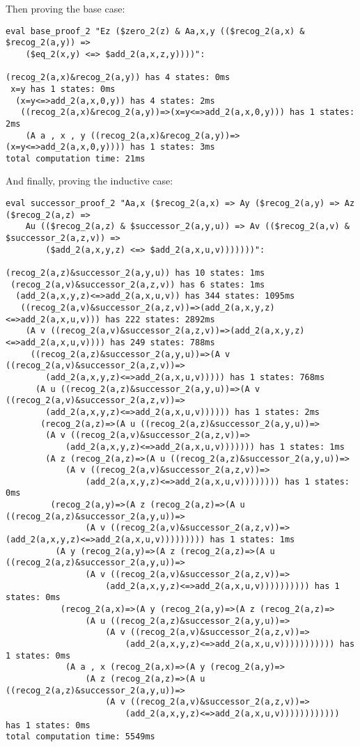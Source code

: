 Then proving the base case:
\begin{lstlisting}[basicstyle=\scriptsize\ttfamily]
eval base_proof_2 "Ez ($zero_2(z) & Aa,x,y (($recog_2(a,x) & $recog_2(a,y)) => 
    ($eq_2(x,y) <=> $add_2(a,x,z,y))))":

(recog_2(a,x)&recog_2(a,y)) has 4 states: 0ms
 x=y has 1 states: 0ms
  (x=y<=>add_2(a,x,0,y)) has 4 states: 2ms
   ((recog_2(a,x)&recog_2(a,y))=>(x=y<=>add_2(a,x,0,y))) has 1 states: 2ms
    (A a , x , y ((recog_2(a,x)&recog_2(a,y))=>(x=y<=>add_2(a,x,0,y)))) has 1 states: 3ms
total computation time: 21ms
\end{lstlisting}

And finally, proving the inductive case:
\begin{lstlisting}[basicstyle=\scriptsize\ttfamily]
eval successor_proof_2 "Aa,x ($recog_2(a,x) => Ay ($recog_2(a,y) => Az ($recog_2(a,z) => 
    Au (($recog_2(a,z) & $successor_2(a,y,u)) => Av (($recog_2(a,v) & $successor_2(a,z,v)) =>
        ($add_2(a,x,y,z) <=> $add_2(a,x,u,v)))))))":
        
(recog_2(a,z)&successor_2(a,y,u)) has 10 states: 1ms
 (recog_2(a,v)&successor_2(a,z,v)) has 6 states: 1ms
  (add_2(a,x,y,z)<=>add_2(a,x,u,v)) has 344 states: 1095ms
   ((recog_2(a,v)&successor_2(a,z,v))=>(add_2(a,x,y,z)<=>add_2(a,x,u,v))) has 222 states: 2892ms
    (A v ((recog_2(a,v)&successor_2(a,z,v))=>(add_2(a,x,y,z)<=>add_2(a,x,u,v)))) has 249 states: 788ms
     ((recog_2(a,z)&successor_2(a,y,u))=>(A v ((recog_2(a,v)&successor_2(a,z,v))=>
        (add_2(a,x,y,z)<=>add_2(a,x,u,v))))) has 1 states: 768ms
      (A u ((recog_2(a,z)&successor_2(a,y,u))=>(A v ((recog_2(a,v)&successor_2(a,z,v))=>
        (add_2(a,x,y,z)<=>add_2(a,x,u,v)))))) has 1 states: 2ms
       (recog_2(a,z)=>(A u ((recog_2(a,z)&successor_2(a,y,u))=>
        (A v ((recog_2(a,v)&successor_2(a,z,v))=>
            (add_2(a,x,y,z)<=>add_2(a,x,u,v))))))) has 1 states: 1ms
        (A z (recog_2(a,z)=>(A u ((recog_2(a,z)&successor_2(a,y,u))=>
            (A v ((recog_2(a,v)&successor_2(a,z,v))=>
                (add_2(a,x,y,z)<=>add_2(a,x,u,v)))))))) has 1 states: 0ms
         (recog_2(a,y)=>(A z (recog_2(a,z)=>(A u ((recog_2(a,z)&successor_2(a,y,u))=>
                (A v ((recog_2(a,v)&successor_2(a,z,v))=>(add_2(a,x,y,z)<=>add_2(a,x,u,v))))))))) has 1 states: 1ms
          (A y (recog_2(a,y)=>(A z (recog_2(a,z)=>(A u ((recog_2(a,z)&successor_2(a,y,u))=>
                (A v ((recog_2(a,v)&successor_2(a,z,v))=>
                    (add_2(a,x,y,z)<=>add_2(a,x,u,v)))))))))) has 1 states: 0ms
           (recog_2(a,x)=>(A y (recog_2(a,y)=>(A z (recog_2(a,z)=>
                (A u ((recog_2(a,z)&successor_2(a,y,u))=>
                    (A v ((recog_2(a,v)&successor_2(a,z,v))=>
                        (add_2(a,x,y,z)<=>add_2(a,x,u,v))))))))))) has 1 states: 0ms
            (A a , x (recog_2(a,x)=>(A y (recog_2(a,y)=>
                (A z (recog_2(a,z)=>(A u ((recog_2(a,z)&successor_2(a,y,u))=>
                    (A v ((recog_2(a,v)&successor_2(a,z,v))=>
                        (add_2(a,x,y,z)<=>add_2(a,x,u,v)))))))))))) has 1 states: 0ms
total computation time: 5549ms
\end{lstlisting}

